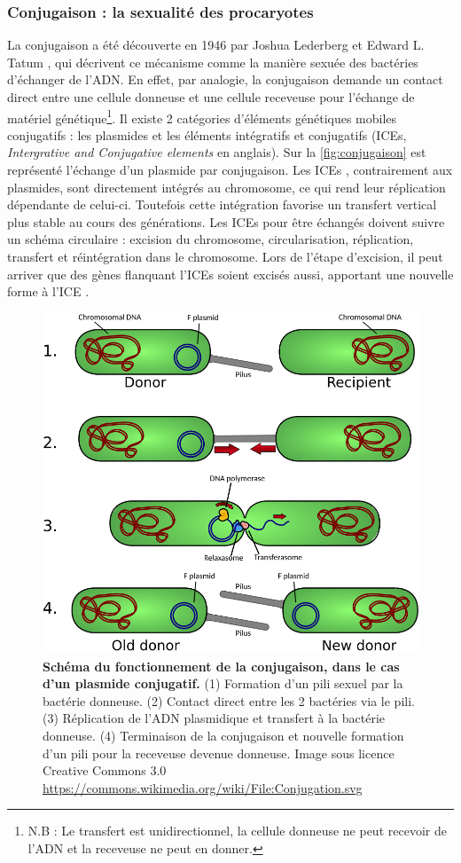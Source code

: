 \subsubsection{Conjugaison : la sexualité des procaryotes}

La conjugaison a été découverte en 1946 par Joshua Lederberg et Edward L. Tatum \cite{lederberg_sex_1953}, qui décrivent ce mécanisme comme la manière sexuée des bactéries d'échanger de l'ADN. En effet, par analogie, la conjugaison demande un contact direct entre une cellule donneuse et une cellule receveuse pour l'échange de matériel génétique\footnote{N.B : Le transfert est unidirectionnel, la cellule donneuse ne peut recevoir de l'ADN et la receveuse ne peut en donner.}. Il existe 2 catégories d'éléments génétiques mobiles conjugatifs : les plasmides et les éléments intégratifs et conjugatifs (ICEs, \textit{Intergrative and Conjugative elements} en anglais). Sur la \autoref{fig:conjugaison} est représenté l'échange d'un plasmide par conjugaison. Les ICEs \cite{johnson_integrative_2015}, contrairement aux plasmides, sont directement intégrés au chromosome, ce qui rend leur réplication dépendante  de celui-ci. Toutefois cette intégration favorise un transfert vertical plus stable au cours des générations. Les ICEs pour être échangés doivent suivre un schéma circulaire : excision du chromosome, circularisation, réplication, transfert et réintégration dans le chromosome. Lors de l'étape d'excision, il peut arriver que des gènes flanquant l'ICEs soient excisés aussi, apportant une nouvelle forme à l'ICE \cite{gibbons_genomic_2011}.

\begin{figure}[htbp]
    \centering
    \includegraphics[width=0.7\linewidth]{images/Conjugation.png}
    \caption[Schéma du fonctionnement de la conjugaison]{\textbf{Schéma du fonctionnement de la conjugaison, dans le cas d'un plasmide conjugatif.} (1) Formation d'un pili sexuel par la bactérie donneuse. (2) Contact direct entre les 2 bactéries via le pili. (3) Réplication de l'ADN plasmidique et transfert à la bactérie donneuse. (4) Terminaison de la conjugaison et nouvelle formation d'un pili pour la receveuse devenue donneuse. Image sous licence Creative Commons 3.0 \url{https://commons.wikimedia.org/wiki/File:Conjugation.svg}}
    \label{fig:conjugaison}
\end{figure}

